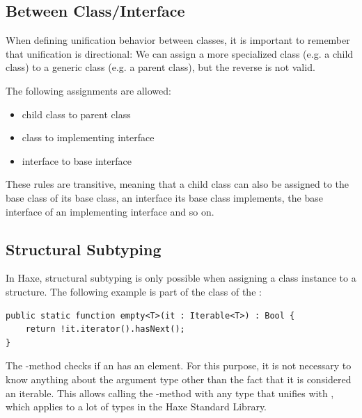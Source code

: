 \documentclass{haxe}
\begin{document}
\subsection{Between Class/Interface}
\label{type-system-unification-between-classes-and-interfaces}

When defining unification behavior between classes, it is important to remember that unification is directional: We can assign a more specialized class (e.g. a child class) to a generic class (e.g. a parent class), but the reverse is not valid.

The following assignments are allowed:

\begin{itemize}
	\item child class to parent class
	\item class to implementing interface
	\item interface to base interface
\end{itemize}
These rules are transitive, meaning that a child class can also be assigned to the base class of its base class, an interface its base class implements, the base interface of an implementing interface and so on.

\subsection{Structural Subtyping}
\label{type-system-structural-subtyping}


In Haxe, structural subtyping is only possible when assigning a class instance to a structure. The following example is part of the  class of the :

\begin{lstlisting}
public static function empty<T>(it : Iterable<T>) : Bool {
	return !it.iterator().hasNext();
}
\end{lstlisting}
The -method checks if an  has an element. For this purpose, it is not necessary to know anything about the argument type other than the fact that it is considered an iterable. This allows calling the -method with any type that unifies with , which applies to a lot of types in the Haxe Standard Library.
\end{document}
